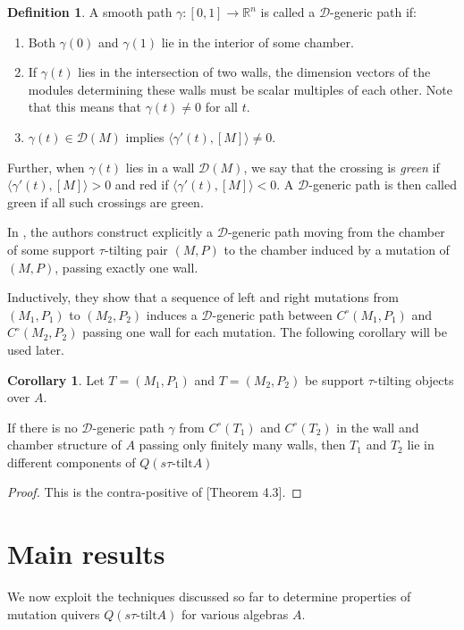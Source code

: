 \documentclass[]{article}
\theoremstyle{definition}
\newtheorem{definition}{Definition}[section]
\newtheorem{corollary}{Corollary}[section]
\newcommand{\tu}{\ensuremath{\tau}}
\begin{document}
\begin{definition}%
	A smooth path $\gamma:[0,1] \to \mathbb{R}^n$ is called a $\mathcal{D}$-generic path if:
	
	\begin{enumerate}
		\item Both $\gamma(0)$ and $\gamma(1)$ lie in the interior of some chamber.
		\item If $\gamma(t)$ lies in the intersection of two walls, the dimension vectors of the modules determining these walls must be scalar multiples of each other. Note that this means that $\gamma(t) \neq 0$ for all $t$.
		\item $\gamma(t) \in \mathcal{D}(M)$ implies $\langle \gamma'(t),[M]\rangle \neq 0$.
	\end{enumerate}

	Further, when $\gamma(t)$ lies in a wall $\mathcal{D}(M)$, we say that the crossing is \textit{green} if $\langle \gamma'(t),[M]\rangle > 0$ and red if $\langle \gamma'(t),[M]\rangle < 0$. A $\mathcal{D}$-generic path is then called green if all such crossings are green.
\end{definition}

In \cite[Lemma 4.2]{Br_stle_2019}, the authors construct explicitly a $\mathcal{D}$-generic path moving from the chamber of some support \tu-tilting pair $(M,P)$ to the chamber induced by a mutation of $(M,P)$, passing exactly one wall.

Inductively, they show that a sequence of left and right mutations from $(M_1,P_1)$ to $(M_2,P_2)$ induces a $\mathcal{D}$-generic path between $C^\circ(M_1,P_1)$ and $C^\circ(M_2,P_2)$ passing one wall for each mutation. The following corollary will be used later.

\begin{corollary}\label{corollary-dgeneric}
	Let $T = (M_1,P_1)$ and $T = (M_2,P_2)$ be support \tu-tilting objects over $A$.
	
	If there is no $\mathcal{D}$-generic path $\gamma$ from $C^\circ(T_1)$ and $C^\circ(T_2)$ in the wall and chamber structure of $A$ passing only finitely many walls, then $T_1$ and $T_2$ lie in different components of $Q(s\tau\text{-tilt} A)$
\end{corollary}

\begin{proof}
	This is the contra-positive of [Theorem 4.3]\cite{Br_stle_2019}.
\end{proof}

\section{Main results}
We now exploit the techniques discussed so far to determine properties of mutation quivers $Q(s\tau\text{-tilt} A)$ for various algebras $A$.
\end{document}
